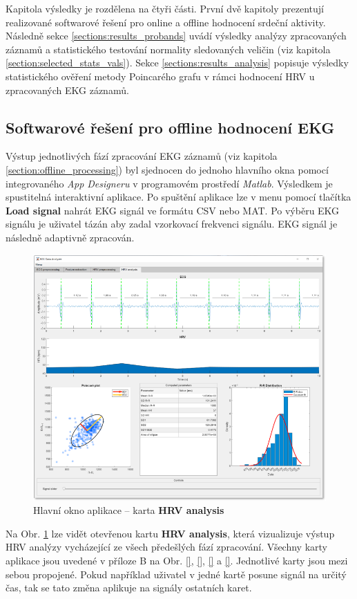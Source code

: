 Kapitola výsledky je rozdělena na čtyři části. První dvě kapitoly prezentují
realizované softwarové řešení pro online a offline hodnocení srdeční aktivity.
Následně sekce \ref{sections:results_probands} uvádí výsledky analýzy
zpracovaných záznamů a statistického testování normality sledovaných veličin
(viz kapitola \ref{section:selected_stats_vals}). Sekce
\ref{sections:results_analysis} popisuje výsledky statistického ověření metody
Poincarého grafu v rámci hodnocení HRV u zpracovaných EKG záznamů.

\subsection{Softwarové řešení pro offline hodnocení EKG}
\label{sections:results_online}
Výstup jednotlivých fází zpracování EKG záznamů (viz kapitola
\ref{section:offline_processing}) byl sjednocen do jednoho hlavního okna pomocí
integrovaného \textit{App Designeru} \cite{matlabAPPDESIGNER} v programovém
prostředí \textit{Matlab}. Výsledkem je spustitelná interaktivní aplikace. Po
spuštění aplikace lze v menu pomocí tlačítka \textbf{Load signal} nahrát EKG
signál ve formátu CSV nebo MAT. Po výběru EKG signálu je uživatel tázán aby
zadal vzorkovací frekvenci signálu. EKG signál je následně adaptivně zpracován.
\begin{figure}[h]
	\begin{center}
		\includegraphics[width=1\textwidth]{../assets/matlab_EDA/tab4}
		\caption{Hlavní okno aplikace -- karta \textbf{HRV analysis}}
		\label{fig:results_matlab_tab4}
	\end{center}
\end{figure}
Na Obr. \ref{fig:results_matlab_tab4} lze vidět otevřenou kartu \textbf{HRV
	analysis}, která vizualizuje výstup HRV analýzy vycházející ze všech předešlých
fází zpracování. Všechny karty aplikace jsou uvedené v příloze B na Obr. \ref{},
\ref{}, \ref{} a \ref{}. Jednotlivé karty jsou mezi sebou propojené. Pokud
například uživatel v jedné kartě posune signál na určitý čas, tak se tato změna
aplikuje na signály ostatních karet.

